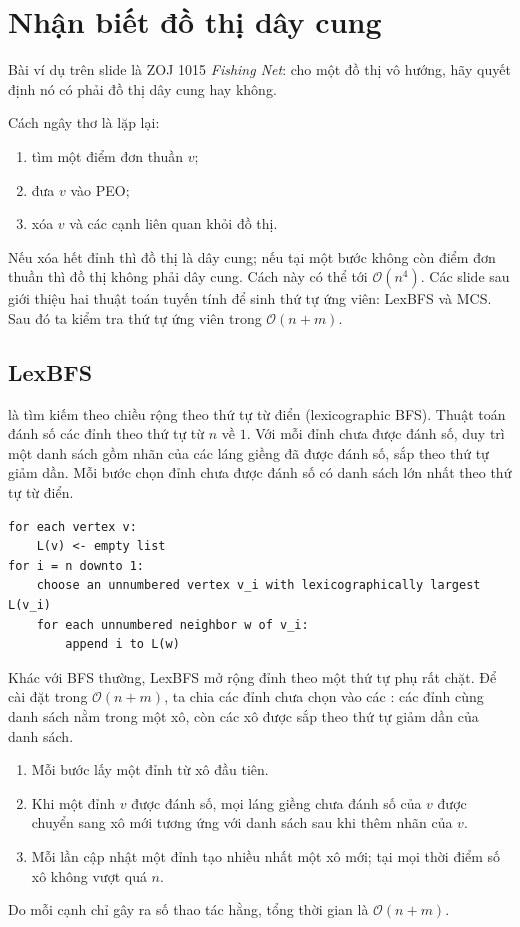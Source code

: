 \documentclass[11pt]{article}
\newcommand{\Oh}{\mathcal{O}}
\begin{document}
\section{Nhận biết đồ thị dây cung}

Bài ví dụ trên slide là ZOJ 1015 \emph{Fishing Net}: cho một đồ thị vô
hướng, hãy quyết định nó có phải đồ thị dây cung hay không.

Cách ngây thơ là lặp lại:
\begin{enumerate}
  \item tìm một điểm đơn thuần \(v\);
  \item đưa \(v\) vào PEO;
  \item xóa \(v\) và các cạnh liên quan khỏi đồ thị.
\end{enumerate}
Nếu xóa hết đỉnh thì đồ thị là dây cung; nếu tại một bước không còn điểm đơn
thuần thì đồ thị không phải dây cung. Cách này có thể tới \(\Oh(n^4)\).
Các slide sau giới thiệu hai thuật toán tuyến tính để sinh thứ tự ứng viên:
LexBFS và MCS. Sau đó ta kiểm tra thứ tự ứng viên trong \(\Oh(n+m)\).

\subsection{LexBFS}

 là tìm kiếm theo chiều rộng theo thứ tự từ điển
(lexicographic BFS). Thuật toán đánh số các đỉnh theo thứ tự từ \(n\) về
\(1\). Với mỗi đỉnh chưa được đánh số, duy trì một danh sách gồm nhãn của các
láng giềng đã được đánh số, sắp theo thứ tự giảm dần. Mỗi bước chọn đỉnh chưa
được đánh số có danh sách lớn nhất theo thứ tự từ điển.

\begin{verbatim}
for each vertex v:
    L(v) <- empty list
for i = n downto 1:
    choose an unnumbered vertex v_i with lexicographically largest L(v_i)
    for each unnumbered neighbor w of v_i:
        append i to L(w)
\end{verbatim}

Khác với BFS thường, LexBFS mở rộng đỉnh theo một thứ tự phụ rất chặt. Để cài
đặt trong \(\Oh(n+m)\), ta chia các đỉnh chưa chọn vào các : các
đỉnh cùng danh sách nằm trong một xô, còn các xô được sắp theo thứ tự giảm
dần của danh sách.
\begin{enumerate}
  \item Mỗi bước lấy một đỉnh từ xô đầu tiên.
  \item Khi một đỉnh \(v\) được đánh số, mọi láng giềng chưa đánh số của
  \(v\) được chuyển sang xô mới tương ứng với danh sách sau khi thêm nhãn của
  \(v\).
  \item Mỗi lần cập nhật một đỉnh tạo nhiều nhất một xô mới; tại mọi thời
  điểm số xô không vượt quá \(n\).
\end{enumerate}
Do mỗi cạnh chỉ gây ra số thao tác hằng, tổng thời gian là \(\Oh(n+m)\).
\end{document}
